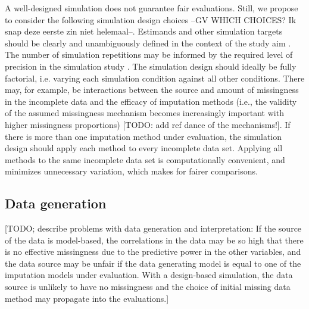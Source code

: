 \documentclass[bimj,fleqn]{w-art}
\begin{document}
A well-designed simulation does not guarantee fair evaluations. Still, we propose to consider the following simulation design choices --GV WHICH CHOICES? Ik snap deze eerste zin niet helemaal--. Estimands and other simulation targets should be clearly and unambiguously defined in the context of the study aim \citet{pete14}. The number of simulation repetitions may be informed by the required level of precision in the simulation study \citep[e.g. as determined from a maximum tolerable level of uncertainty in terms of a performance measure's Monte Carlo error][]{morr18}. The simulation design should ideally be fully factorial, i.e. varying each simulation condition against all other conditions. There may, for example, be interactions between the source and amount of missingness in the incomplete data and the efficacy of imputation methods (i.e., the validity of the assumed missingness mechanism becomes increasingly important with higher missingness proportions) [TODO: add ref dance of the mechanisms!]. If there is more than one imputation method under evaluation, the simulation design should apply each method to every incomplete data set. Applying all methods to the same incomplete data set is computationally convenient, and minimizes unnecessary variation, which makes for fairer comparisons.


\subsection{Data generation}


[TODO; describe problems with data generation and interpretation: If the source of the data is model-based, the correlations in the data may be so high that there is no effective missingness due to the predictive power in the other variables, and the data source may be unfair if the data generating model is equal to one of the imputation models under evaluation. With a design-based simulation, the data source is unlikely to have no missingness and the choice of initial missing data method may propagate into the evaluations.]
\end{document}
